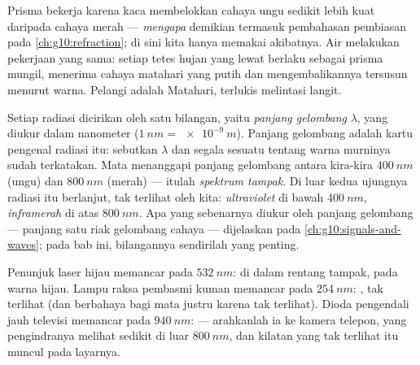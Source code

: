 \begin{remark}\label{rem:g10:light-spectra:rainbow}
Prisma bekerja karena kaca membelokkan cahaya ungu sedikit lebih kuat
daripada cahaya merah --- \emph{mengapa} demikian termasuk pembahasan
pembiasan pada \cref{ch:g10:refraction}; di sini kita hanya memakai
akibatnya. Air melakukan pekerjaan yang sama: setiap tetes hujan yang
lewat berlaku sebagai prisma mungil, menerima cahaya matahari yang
putih dan mengembalikannya tersusun menurut warna. Pelangi adalah
 Matahari, terlukis melintasi langit.
\end{remark}

\begin{definition}\label{def:g10:light-spectra:wavelength}
Setiap radiasi  dicirikan oleh satu bilangan, yaitu
\emph{panjang gelombang} $\lambda$, yang
diukur dalam nanometer ($\qty{1}{nm} = \qty{e-9}{m}$). Panjang
gelombang adalah kartu pengenal radiasi itu: sebutkan $\lambda$ dan
segala sesuatu tentang warna murninya sudah terkatakan. Mata menanggapi
panjang gelombang antara kira-kira $\qty{400}{nm}$ (ungu) dan
$\qty{800}{nm}$ (merah) --- itulah \emph{spektrum tampak}. Di luar kedua ujungnya radiasi itu berlanjut, tak terlihat oleh
kita: \emph{ultraviolet} di bawah $\qty{400}{nm}$,
\emph{inframerah} di atas $\qty{800}{nm}$. Apa yang
sebenarnya diukur oleh panjang gelombang --- panjang satu riak
gelombang cahaya --- dijelaskan pada \cref{ch:g10:signals-and-waves};
pada bab ini, bilangannya sendirilah yang penting.
\end{definition}

\begin{example}\label{ex:g10:light-spectra:classify}
Penunjuk laser hijau memancar pada $\qty{532}{nm}$: di dalam rentang
tampak, pada warna hijau. Lampu raksa pembasmi kuman memancar pada
$\qty{254}{nm}$: , tak terlihat (dan berbahaya bagi mata
justru karena tak terlihat). Dioda pengendali jauh televisi memancar
pada $\qty{940}{nm}$:  --- arahkanlah ia ke kamera telepon,
yang pengindranya melihat sedikit di luar $\qty{800}{nm}$, dan kilatan
yang tak terlihat itu muncul pada layarnya.
\end{example}


